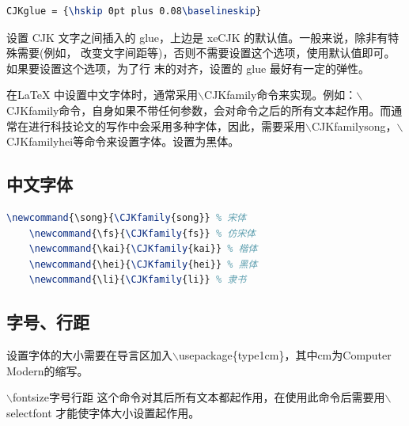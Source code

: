 \documentclass[12pt]{book}
\begin{document}
\begin{lstlisting}[language=tex]
	CJKglue = {\hskip 0pt plus 0.08\baselineskip}
\end{lstlisting}

设置 CJK 文字之间插入的 glue，上边是 xeCJK 的默认值。一般来说，除非有特殊需要(例如， 改变文字间距等)，否则不需要设置这个选项，使用默认值即可。如果要设置这个选项，为了行 末的对齐，设置的 glue 最好有一定的弹性。

在\LaTeX{} 中设置中文字体时，通常采用$\backslash$CJKfamily{}命令来实现。例如：$\backslash$CJKfamily命令，自身如果不带任何参数，会对命令之后的所有文本起作用。而通常在进行科技论文的写作中会采用多种字体，因此，需要采用$\backslash$CJKfamily{song}，$\backslash$CJKfamily{hei}等命令来设置字体。设置为黑体。

\subsection{中文字体}

\begin{lstlisting}[language=tex]
	\newcommand{\song}{\CJKfamily{song}} % 宋体
	\newcommand{\fs}{\CJKfamily{fs}} % 仿宋体
	\newcommand{\kai}{\CJKfamily{kai}} % 楷体
	\newcommand{\hei}{\CJKfamily{hei}} % 黑体
	\newcommand{\li}{\CJKfamily{li}} % 隶书
\end{lstlisting}

\subsection{字号、行距}

设置字体的大小需要在导言区加入$\backslash$usepackage\{type1cm\}，其中cm为Computer Modern的缩写。

$\backslash$fontsize{字号}{行距}
这个命令对其后所有文本都起作用，在使用此命令后需要用$\backslash$selectfont 才能使字体大小设置起作用。


\begin{table}[htbp]
\end{table}
\end{document}
